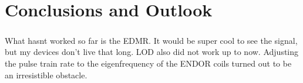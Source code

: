 \chapter{Conclusions and Outlook}

\paragraph*{}
What hasnt worked so far is the EDMR. It would be super cool to see the signal, but my devices don't live that long. LOD also did not work up to now. Adjusting the pulse train rate to the eigenfrequency of the ENDOR coils turned out to be an irresistible obstacle.




